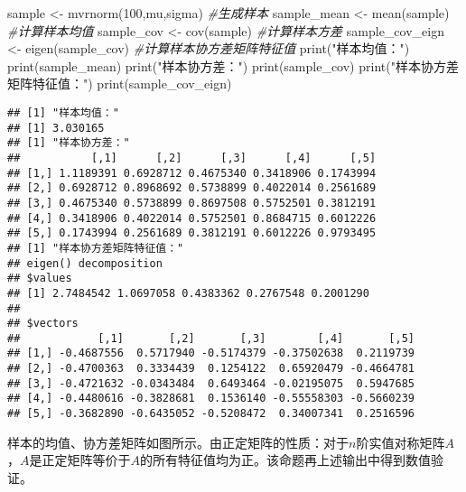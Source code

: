 \documentclass[
]{article}
\newenvironment{Shaded}{\begin{snugshade}}{\end{snugshade}}
\newcommand{\CommentTok}[1]{\textcolor[rgb]{0.56,0.35,0.01}{\textit{#1}}}
\newcommand{\DecValTok}[1]{\textcolor[rgb]{0.00,0.00,0.81}{#1}}
\newcommand{\FunctionTok}[1]{\textcolor[rgb]{0.00,0.00,0.00}{#1}}
\newcommand{\NormalTok}[1]{#1}
\newcommand{\OtherTok}[1]{\textcolor[rgb]{0.56,0.35,0.01}{#1}}
\newcommand{\StringTok}[1]{\textcolor[rgb]{0.31,0.60,0.02}{#1}}
\begin{document}
\begin{Shaded}
\begin{Highlighting}[]
\NormalTok{sample }\OtherTok{\textless{}{-}} \FunctionTok{mvrnorm}\NormalTok{(}\DecValTok{100}\NormalTok{,mu,sigma) }\CommentTok{\#生成样本}
\NormalTok{sample\_mean }\OtherTok{\textless{}{-}} \FunctionTok{mean}\NormalTok{(sample) }\CommentTok{\#计算样本均值}
\NormalTok{sample\_cov }\OtherTok{\textless{}{-}} \FunctionTok{cov}\NormalTok{(sample) }\CommentTok{\#计算样本方差}
\NormalTok{sample\_cov\_eign }\OtherTok{\textless{}{-}} \FunctionTok{eigen}\NormalTok{(sample\_cov) }\CommentTok{\#计算样本协方差矩阵特征值}
\FunctionTok{print}\NormalTok{(}\StringTok{"样本均值："}\NormalTok{)}
\FunctionTok{print}\NormalTok{(sample\_mean)}
\FunctionTok{print}\NormalTok{(}\StringTok{"样本协方差："}\NormalTok{)}
\FunctionTok{print}\NormalTok{(sample\_cov)}
\FunctionTok{print}\NormalTok{(}\StringTok{"样本协方差矩阵特征值："}\NormalTok{)}
\FunctionTok{print}\NormalTok{(sample\_cov\_eign)}
\end{Highlighting}
\end{Shaded}

\begin{verbatim}
## [1] "样本均值："
## [1] 3.030165
## [1] "样本协方差："
##           [,1]      [,2]      [,3]      [,4]      [,5]
## [1,] 1.1189391 0.6928712 0.4675340 0.3418906 0.1743994
## [2,] 0.6928712 0.8968692 0.5738899 0.4022014 0.2561689
## [3,] 0.4675340 0.5738899 0.8697508 0.5752501 0.3812191
## [4,] 0.3418906 0.4022014 0.5752501 0.8684715 0.6012226
## [5,] 0.1743994 0.2561689 0.3812191 0.6012226 0.9793495
## [1] "样本协方差矩阵特征值："
## eigen() decomposition
## $values
## [1] 2.7484542 1.0697058 0.4383362 0.2767548 0.2001290
## 
## $vectors
##            [,1]       [,2]       [,3]        [,4]       [,5]
## [1,] -0.4687556  0.5717940 -0.5174379 -0.37502638  0.2119739
## [2,] -0.4700363  0.3334439  0.1254122  0.65920479 -0.4664781
## [3,] -0.4721632 -0.0343484  0.6493464 -0.02195075  0.5947685
## [4,] -0.4480616 -0.3828681  0.1536140 -0.55558303 -0.5660239
## [5,] -0.3682890 -0.6435052 -0.5208472  0.34007341  0.2516596
\end{verbatim}

样本的均值、协方差矩阵如图所示。由正定矩阵的性质：对于\(n\)阶实值对称矩阵\(A\)，\(A\)是正定矩阵等价于\(A\)的所有特征值均为正。该命题再上述输出中得到数值验证。
\end{document}
